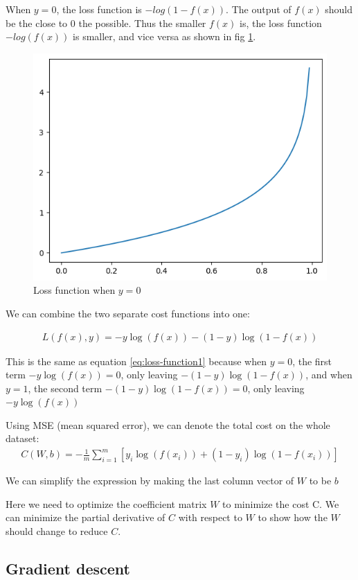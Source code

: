 \documentclass[stu,12pt,floatsintext]{apa7}
\begin{document}
When $y=0$, the loss function is $-log(1-f(x))$. The output of $f(x)$ should be the close to $0$ the possible. Thus the smaller $f(x)$ is, the loss function $-log(f(x))$ is smaller, and vice versa as shown in fig \ref{fig:loss-function2}.

\begin{figure}[h]
    \centering
    \includegraphics[width=0.6\linewidth]{images/loss-function2.png}
    \caption{Loss function when $y=0$}
    \label{fig:loss-function2}
\end{figure}

We can combine the two separate cost functions into one:

\begin{gather}
    L(f(x),y)=-y\log (f(x))-(1-y)\log (1-f(x))
\end{gather}

This is the same as equation \ref{eq:loss-function1} because when $y=0$, the first term $-y\log (f(x))=0$, only leaving $-(1-y)\log (1-f(x))$, and when $y=1$, the second term $-(1-y)\log (1-f(x))=0$, only leaving $-y\log (f(x))$

Using MSE (mean squared error), we can denote the total cost on the whole dataset:
\begin{gather}
    C(W,b)=-\frac{1}{m}\sum^m_{i=1}[y_i\log(f(x_i))+(1-y_i)\log (1-f(x_i))]
\end{gather}

We can simplify the expression by making the last column vector of $W$ to be $b$

Here we need to optimize the coefficient matrix $W$ to minimize the cost C. We can minimize the partial derivative of $C$ with respect to $W$ to show how the $W$ should change to reduce $C$.

\subsection{Gradient descent}
\end{document}
